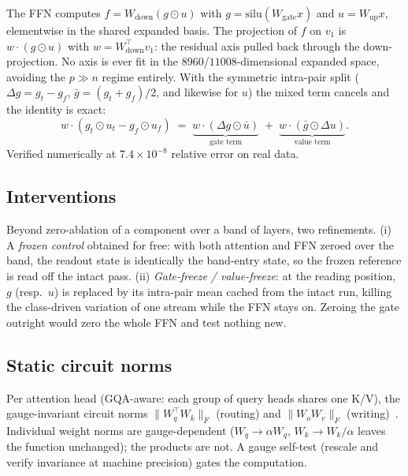 \documentclass[11pt]{article}
\begin{document}
The FFN computes $f = W_{\mathrm{down}}(g \odot u)$ with
$g = \mathrm{silu}(W_{\mathrm{gate}} x)$ and $u = W_{\mathrm{up}} x$,
elementwise in the shared expanded basis. The projection of $f$ on $v_1$ is
$w \cdot (g \odot u)$ with $w = W_{\mathrm{down}}^{\top} v_1$: the residual
axis pulled back through the down-projection. No axis is ever fit in the
$8960$/$11008$-dimensional expanded space, avoiding the $p \gg n$ regime
entirely. With the symmetric intra-pair split
($\Delta g = g_t - g_f$, $\bar{g} = (g_t + g_f)/2$, and likewise for $u$)
the mixed term cancels and the identity is exact:
\begin{equation}
w \cdot (g_t \odot u_t - g_f \odot u_f)
\;=\;
\underbrace{w \cdot (\Delta g \odot \bar{u})}_{\text{gate term}}
\;+\;
\underbrace{w \cdot (\bar{g} \odot \Delta u)}_{\text{value term}}.
\label{eq:split}
\end{equation}
Verified numerically at $7.4 \times 10^{-8}$ relative error on real data.

\subsection{Interventions}
\label{sec:interventions}

Beyond zero-ablation of a component over a band of layers, two refinements.
(i) A \emph{frozen control} obtained for free: with both attention and FFN
zeroed over the band, the readout state is identically the band-entry state,
so the frozen reference is read off the intact pass. (ii)
\emph{Gate-freeze / value-freeze}: at the reading position, $g$ (resp.\ $u$)
is replaced by its intra-pair mean cached from the intact run, killing the
class-driven variation of one stream while the FFN stays on. Zeroing the
gate outright would zero the whole FFN and test nothing new.

\subsection{Static circuit norms}
\label{sec:circuits}

Per attention head (GQA-aware: each group of query heads shares one K/V),
the gauge-invariant circuit norms $\lVert W_q^{\top} W_k \rVert_F$ (routing)
and $\lVert W_o W_v \rVert_F$ (writing)~\cite{elhage2021}. Individual weight
norms are gauge-dependent ($W_q \to \alpha W_q$, $W_k \to W_k/\alpha$ leaves
the function unchanged); the products are not. A gauge self-test (rescale
and verify invariance at machine precision) gates the computation.
\end{document}
